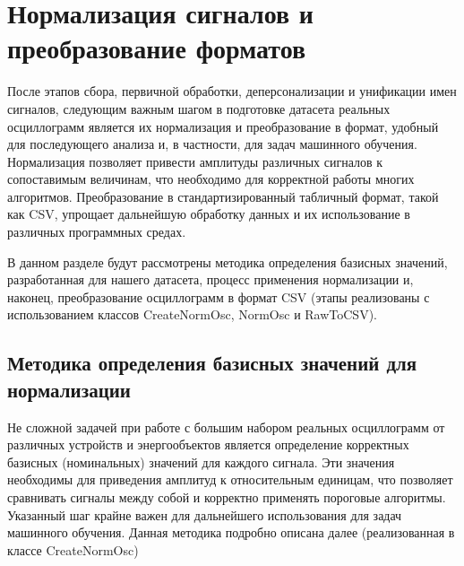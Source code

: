 
\section{Нормализация сигналов и преобразование форматов}\label{sec:ch3_normalization_and_formats}

После этапов сбора, первичной обработки, деперсонализации и унификации имен сигналов,
следующим важным шагом в подготовке датасета реальных осциллограмм является их
нормализация и преобразование в формат, удобный для последующего анализа и, в частности,
для задач машинного обучения. Нормализация позволяет привести амплитуды различных
сигналов к сопоставимым величинам, что необходимо для корректной работы многих
алгоритмов. Преобразование в стандартизированный табличный формат, такой как CSV,
упрощает дальнейшую обработку данных и их использование в различных программных средах.

В данном разделе будут рассмотрены методика определения базисных значений, разработанная
для нашего датасета, процесс применения нормализации и, наконец, преобразование
осциллограмм в формат CSV (этапы реализованы с использованием классов CreateNormOsc,
NormOsc и RawToCSV).

\subsection{Методика определения базисных значений для нормализации}\label{sec:ch3_basis_values_methodology}

Не сложной задачей при работе с большим набором реальных осциллограмм от различных устройств и энергообъектов является определение корректных базисных (номинальных) значений для каждого сигнала. Эти значения необходимы для приведения амплитуд к относительным единицам, что позволяет сравнивать сигналы между собой и корректно применять пороговые алгоритмы. Указанный шаг крайне важен для дальнейшего использования для задач машинного обучения. Данная методика подробно описана далее (реализованная в классе CreateNormOsc)


